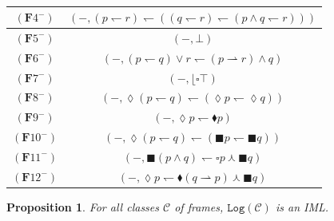 \documentclass[draft]{article}
\newtheorem{proposition}{Proposition}
\def\Formula{\mathbf{A}}
\def\Formula{\mathbf{F}}
\def\Log{\mathtt{Log}}
\begin{document}
\begin{table}[ht]
\begin{center}
\begin{tabular}{|c|c|}
%
%
\\
%
%
\hline
%
%
$(\Formula4^{-})$&$(-,(p{\leftharpoondown}r){\leftharpoondown}((q{\leftharpoondown}r){\leftharpoondown}(p{\wedge}q{\leftharpoondown}r)))$
%
%
\\
%
%
\hline
%
%
$(\Formula5^{-})$&$(-,{\bot})$
%
%
\\
%
%
\hline
%
%
$(\Formula6^{-})$&$(-,(p{\leftharpoondown}q){\vee}r{\leftharpoondown}(p{\rightharpoonup}r){\wedge}q)$
%
%
\\
%
%
\hline
%
%
$(\Formula7^{-})$&$(-,{\lfloor}{\square}{\top})$
%
%
\\
%
%
\hline
%
%
$(\Formula8^{-})$&$(-,{\lozenge}(p{\leftharpoondown}q){\leftharpoondown}({\lozenge}p{\leftharpoondown}{\lozenge}q))$
%
%
\\
%
%
\hline
%
%
$(\Formula9^{-})$&$(-,{\lozenge}p{\leftharpoondown}{\blacklozenge}p)$
%
%
\\
%
%
\hline
%
%
$(\Formula10^{-})$&$(-,{\lozenge}(p{\leftharpoondown}q){\leftharpoondown}({\blacksquare}p{\leftharpoondown}{\blacksquare}q))$
%
%
\\
%
%
\hline
%
%
$(\Formula11^{-})$&$(-,{\blacksquare}(p{\wedge}q){\leftharpoondown}{\square}p{\curlywedge}{\blacksquare}q)$
%
%
\\
%
%
\hline
%
%
$(\Formula12^{-})$&$(-,{\lozenge}p{\leftharpoondown}{\blacklozenge}(q{\rightharpoonup}p){\curlywedge}{\blacksquare}q)$
%
%
\\
%
%
\hline
%
%
\end{tabular}
%
%
\vspace{+0.25cm}
%
%
\caption{}\label{table:axioms}
%
%
\end{center}
%
%
\end{table}
%
%
\vspace{-0.50cm}
%
%
\begin{proposition}\label{proposition:soundness}
%
%
For all classes ${\mathcal C}$ of frames, $\Log({\mathcal C})$ is an IML.
%
%
\end{proposition}
%
%
\end{document}
